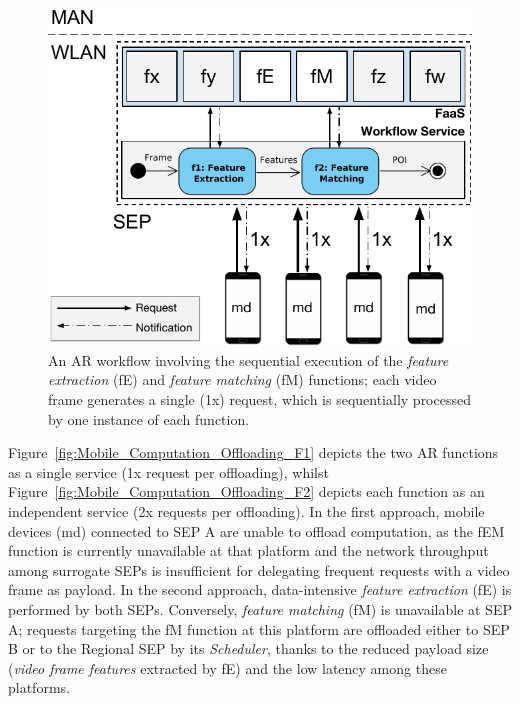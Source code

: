 \begin{figure}[tbp]
	\centering
	\includegraphics[width=1\linewidth]{Figs/Mobile_Computation_Offloading_Workflow.pdf}
	\caption{An AR workflow involving the sequential execution of the \textit{feature extraction} (fE) and \textit{feature matching} (fM) functions; each video frame generates a single (1x) request, which is sequentially processed by one instance of each function.} 
	\label{fig:Mobile_Computation_Offloading_Workflow}
\end{figure}

Figure~\ref{fig:Mobile_Computation_Offloading_F1} depicts the two AR functions as a single service (1x request per offloading), whilst Figure~\ref{fig:Mobile_Computation_Offloading_F2} depicts each function as an independent service (2x requests per offloading). 
In the first approach, mobile devices (md) connected to SEP A are unable to offload computation, as the fEM function is currently unavailable at that platform and the network throughput among surrogate SEPs is insufficient for delegating frequent requests with a video frame as payload.
In the second approach, data-intensive \textit{feature extraction} (fE) is performed by both SEPs. Conversely, \textit{feature matching} (fM) is unavailable at SEP A; requests targeting the fM function at this platform are offloaded either to SEP B or to the Regional SEP by its \textit{Scheduler},
thanks to the reduced payload size (\textit{video frame features} extracted by fE) and the low latency among these platforms. 



